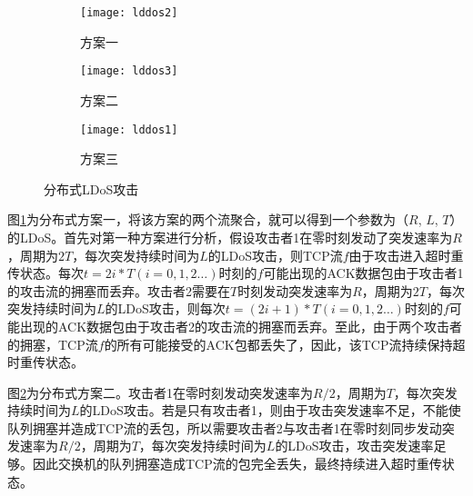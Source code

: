 \begin{figure}
    \vspace{-0.2in}
    \begin{subfigure}{1\textwidth}
        \centering
        \texttt{[image: lddos2]}
        \caption{方案一}
        \label{fig:lldos1}
    \end{subfigure}

    \begin{subfigure}{1\textwidth}
        \centering
        \texttt{[image: lddos3]}
        \caption{方案二}
        \label{fig:lldos2}
    \end{subfigure}

    \begin{subfigure}{1\textwidth}
        \centering
        \texttt{[image: lddos1]}
        \caption{方案三}
        \label{fig:lldos3}
    \end{subfigure}


    \caption{分布式LDoS攻击}
    \label{ffig:lldos}
\end{figure}


图\ref{fig:lldos1}为分布式方案一，将该方案的两个流聚合，就可以得到一个参数为（$R$, $L$, $T$）的LDoS。首先对第一种方案进行分析，假设攻击者1在零时刻发动了突发速率为$R$，周期为$2T$，每次突发持续时间为$L$的LDoS攻击，则TCP流$f$由于攻击进入超时重传状态。每次$t = 2i * T(i=0,1,2…)$时刻的$f$可能出现的ACK数据包由于攻击者1的攻击流的拥塞而丢弃。攻击者2需要在$T$时刻发动突发速率为$R$，周期为$2T$，每次突发持续时间为$L$的LDoS攻击，则每次$t = (2i + 1) * T(i=0,1,2…)$时刻的$f$可能出现的ACK数据包由于攻击者2的攻击流的拥塞而丢弃。至此，由于两个攻击者的拥塞，TCP流$f$的所有可能接受的ACK包都丢失了，因此，该TCP流持续保持超时重传状态。


图\ref{fig:lldos2}为分布式方案二。攻击者1在零时刻发动突发速率为$R/2$，周期为$T$，每次突发持续时间为$L$的LDoS攻击。若是只有攻击者1，则由于攻击突发速率不足，不能使队列拥塞并造成TCP流的丢包，所以需要攻击者2与攻击者1在零时刻同步发动突发速率为$R/2$，周期为$T$，每次突发持续时间为$L$的LDoS攻击，攻击突发速率足够。因此交换机的队列拥塞造成TCP流的包完全丢失，最终持续进入超时重传状态。

